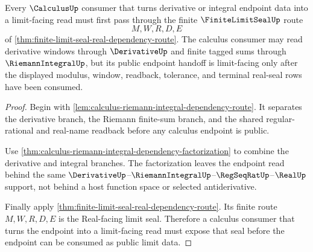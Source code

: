 \begin{theorem}
\label{thm:calculus-finite-limit-seal-dependency}
Every $\CalculusUp$ consumer that turns derivative or integral endpoint data into a limit-facing read must first pass through the finite $\FiniteLimitSealUp$ route
$$
M,W,R,D,E
$$
of \autoref{thm:finite-limit-seal-real-dependency-route}. The calculus consumer may read derivative windows through $\DerivativeUp$ and finite tagged sums through $\RiemannIntegralUp$, but its public endpoint handoff is limit-facing only after the displayed modulus, window, readback, tolerance, and terminal real-seal rows have been consumed.
\end{theorem}
\begin{proof}
Begin with \autoref{lem:calculus-riemann-integral-dependency-route}. It separates the derivative branch, the Riemann finite-sum branch, and the shared regular-rational and real-name readback before any calculus endpoint is public.

Use \autoref{thm:calculus-riemann-integral-dependency-factorization} to combine the derivative and integral branches. The factorization leaves the endpoint read behind the same $\DerivativeUp$--$\RiemannIntegralUp$--$\RegSeqRatUp$--$\RealUp$ support, not behind a host function space or selected antiderivative.

Finally apply \autoref{thm:finite-limit-seal-real-dependency-route}. Its finite route $M,W,R,D,E$ is the Real-facing limit seal. Therefore a calculus consumer that turns the endpoint into a limit-facing read must expose that seal before the endpoint can be consumed as public limit data.
\end{proof}

